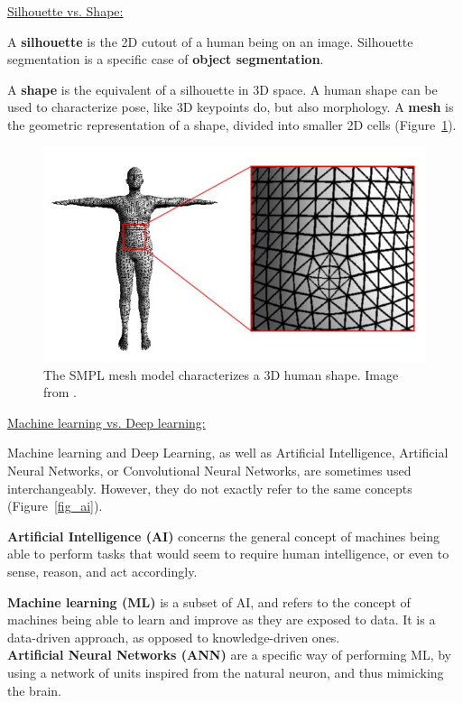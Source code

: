 \vspace*{0.5cm}

\noindent\underline{Silhouette vs. Shape:}

A \textbf{silhouette} is the 2D cutout of a human being on an image. Silhouette segmentation is a specific case of \textbf{object segmentation}. 

A \textbf{shape} is the equivalent of a silhouette in 3D space. A human shape can be used to characterize pose, like 3D keypoints do, but also morphology. A \textbf{mesh} is the geometric representation of a shape, divided into smaller 2D cells (Figure~\ref{fig_meshmodel}).

\begin{figure}[hbtp]
	\centering
            \def\svgwidth{1\columnwidth}
            \fontsize{10pt}{10pt}\selectfont
            \includegraphics[width=0.6\linewidth]{"../Annexes/Figures/Mesh_model.jpg"}
            \caption{The SMPL mesh model characterizes a 3D human shape. Image from \cite{Wu2020}.}
            \label{fig_meshmodel}
\end{figure}
\FloatBarrier

\vspace*{0.5cm}

\noindent\underline{Machine learning vs. Deep learning:}

Machine learning and Deep Learning, as well as Artificial Intelligence, Artificial Neural Networks, or Convolutional Neural Networks, are sometimes used interchangeably. However, they do not exactly refer to the same concepts (Figure~\ref{fig_ai}).

\textbf{Artificial Intelligence (AI)} concerns the general concept of machines being able to perform tasks that would seem to require human intelligence, or even to sense, reason, and act accordingly. 

\textbf{Machine learning (ML)} is a subset of AI, and refers to the concept of machines being able to learn and improve as they are exposed to data. It is a data-driven approach, as opposed to knowledge-driven ones.\\
\textbf{Artificial Neural Networks (ANN)} are a specific way of performing ML, by using a network of units inspired from the natural neuron, and thus mimicking the brain. 

